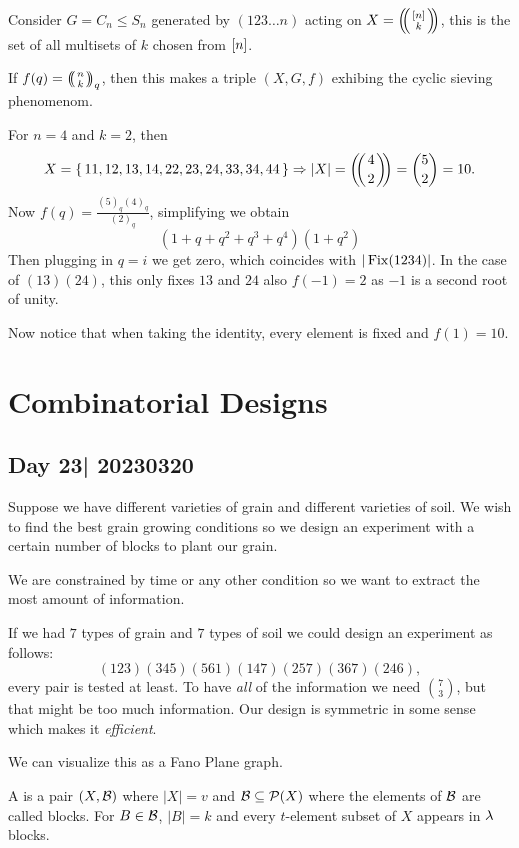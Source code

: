 \documentclass[12pt]{memoir}
\begin{document}
\begin{Ex}
    Consider $G=C_n\leq S_n$ generated by $(123\dots n)$ acting on $X=\multinom{\bonj{n}}{k}$, this is the set of all multisets of $k$ chosen from $\left\lbrack n\right\rbrack$.\par 
    If $f(q)=\multinom{n}{k}_q$, then this makes a triple $(X,G,f)$ exhibing the cyclic sieving phenomenom.\par 
    For $n=4$ and $k=2$, then 
    $$X=\set{11,12,13,14,22,23,24,33,34,44}\To|X|=\multinom{4}{2}=\binom{5}{2}=10.$$
    Now $f(q)=\frac{(5)_q(4)_q}{(2)_q}$, simplifying we obtain 
    $$(1+q+q^2+q^3+q^4)(1+q^2)$$
    Then plugging in $q=i$ we get zero, which coincides with $|\operatorname{Fix}(1234)|$. In the case of $(13)(24)$, this only fixes $13$ and $24$ also $f(-1)=2$ as $-1$ is a second root of unity.\par 
    Now notice that when taking the identity, every element is fixed and $f(1)=10$.
\end{Ex}

\chapter{Combinatorial Designs}
\section{Day 23| 20230320}
Suppose we have different varieties of grain and different varieties of soil. We wish to find the best grain growing conditions so we design an experiment with a certain number of blocks to plant our grain.\par 
We are constrained by time or any other condition so we want to extract the most amount of information. 

\begin{Ex}
If we had $7$ types of grain and $7$ types of soil we could design an experiment as follows:
$$(123)(345)(561)(147)(257)(367)(246),$$
every pair is tested at least. To have \emph{all} of the information we need $\binom{7}{3}$, but that might be too much information. Our design is symmetric in some sense which makes it \emph{efficient}.\par 
We can visualize this as a Fano Plane graph. 
\end{Ex}

\begin{Def}
    A  is a pair $(X,\mathcal{B})$ where $|X|=v$ and $\mathcal{B}\subseteq\mathcal{P}(X)$ where the elements of $\mathcal{B}$ are called blocks. For $B\in\mathcal{B}$, $|B|=k$ and every $t$-element subset of $X$ appears in $\lambda$ blocks.
\end{Def}
\end{document}
